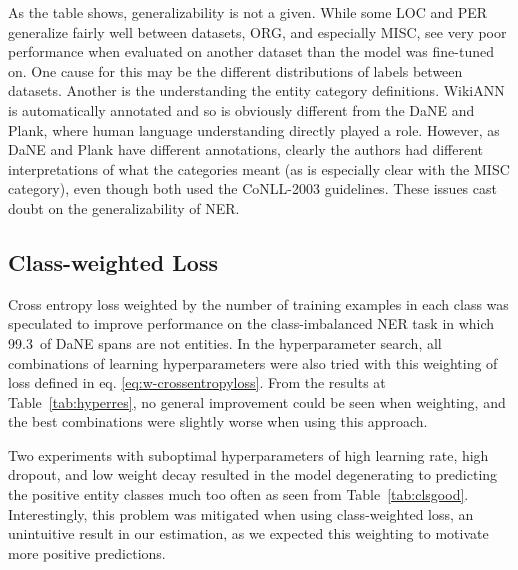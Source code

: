 \documentclass[main.tex]{subfiles}
\begin{document}
As the table shows, generalizability is not a given.
While some LOC and PER generalize fairly well between datasets, ORG, and especially MISC, see very poor performance when evaluated on another dataset than the model was fine-tuned on.
One cause for this may be the different distributions of labels between datasets.
Another is the understanding the entity category definitions.
WikiANN is automatically annotated and so is obviously different from the DaNE and Plank, where human language understanding directly played a role.
However, as DaNE and Plank have different annotations, clearly the authors had different interpretations of what the categories meant (as is especially clear with the MISC category), even though both used the CoNLL-2003 guidelines.
These issues cast doubt on the generalizability of NER.
\cite{hvingelby2020dane, plank2019neural, pan2017wikiann, tjang2003conll}

\subsection{Class-weighted Loss}
\label{subsec:lossexp}
Cross entropy loss weighted by the number of training examples in each class was speculated to improve performance on the class-imbalanced NER task in which 99.3\pro\ of DaNE spans are not entities.
In the hyperparameter search, all combinations of learning hyperparameters were also tried with this weighting of loss defined in eq. \eqref{eq:w-crossentropyloss}.
From the results at Table~\ref{tab:hyperres}, no general improvement could be seen when weighting, and the best combinations were slightly worse when using this approach.

Two experiments with suboptimal hyperparameters of high learning rate, high dropout, and low weight decay resulted in the model degenerating to predicting the positive entity classes much too often as seen from Table~\ref{tab:clsgood}.
Interestingly, this problem was mitigated when using class-weighted loss, an unintuitive result in our estimation, as we expected this weighting to motivate more positive predictions.
\end{document}
